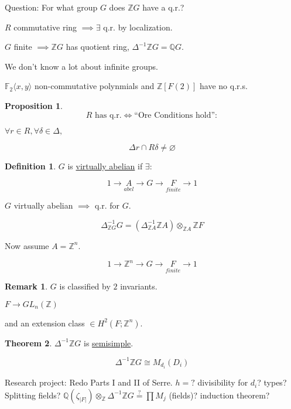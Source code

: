 \documentclass{article}
\theoremstyle{definition}
\newtheorem*{definition}{Definition}
\newtheorem{theorem}{Theorem}
\newtheorem{proposition}[theorem]{Proposition}
\newtheorem*{remark}{Remark}
\begin{document}
Question: For what group \(G\) does \(\mathbb{Z} G\) have a q.r.?

\(R\) commutative ring \(\implies \exists\) q.r. by localization.

\(G\) finite \(\implies \mathbb{Z} G\) has quotient ring, \(\Delta ^{-1} \mathbb{Z} G = \mathbb{Q} G\).

We don't know a lot about infinite groups.

\(\mathbb{F}_2\langle x,y \rangle\) non-commutative polynmials and \(\mathbb{Z} [F(2)]\) have no q.r.s.

\begin{proposition}
    \[
        R \text{ has q.r.} \iff \text{``Ore Conditions hold''}:
    \]

    \(\forall r\in R, \forall \delta \in \Delta,\)
    
    \[
        \Delta r \cap R \delta \neq \varnothing
    \]
\end{proposition}

\begin{definition}
    \(G\) is \underline{virtually abelian} if \(\exists \):

    \[
        1 \to \underset{abel}{A} \to G \to \underset{finite}{F} \to 1 
    \]

    \(G\) virtually abelian \(\implies \) q.r. for \(G\).

    \[
        \Delta_{\mathbb{Z} G}^{-1} G = \left( \Delta_{\mathbb{Z} A}^{-1} \mathbb{Z} A \right) \otimes_{\mathbb{Z} A} \mathbb{Z} F
    \]
\end{definition}

Now assume \(A = \mathbb{Z}^n\).

\[
    1 \to \mathbb{Z}^n \to G \to \underset{finite}{F} \to 1
\]

\begin{remark}
    \(G\) is classified by \(2\) invariants.

    \(F \to GL_n(\mathbb{Z})\)

    and an extension class \(\in H^2(F;\mathbb{Z}^n)\).
\end{remark}

\begin{theorem}
    \(\Delta ^{-1} \mathbb{Z} G\) is \underline{semisimple}.
\end{theorem}

\[
    \Delta ^{-1} \mathbb{Z} G \cong M_{d_i}(D_i)
\]

Research project: Redo Parts I and II of Serre. \(h = ?\) divisibility for \(d_i\)? types? Splitting fields? \(\mathbb{Q}(\zeta_{\vert F \vert}) \otimes_\mathbb{Z} \Delta ^{-1} \mathbb{Z} G \overset{?}{=} \prod M_j\) (fields)? induction theorem?
\end{document}
